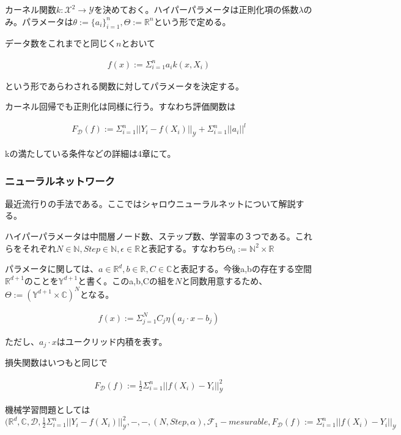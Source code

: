 \documentclass[dvipdfmx, a4paper]{jsarticle}
\begin{document}
カーネル関数$k:\mathcal{X}^2\to\mathcal{Y}$を決めておく。ハイパーパラメータは正則化項の係数$\lambda$のみ。パラメータは$\theta:=\{a_i\}^n_{i=1},\Theta:=\mathbb{R}^n$という形で定める。

データ数をこれまでと同じく$n$とおいて

\begin{align}
f(x):=\Sigma_{i=1}^na_ik(x,X_i)
\end{align}

という形であらわされる関数に対してパラメータを決定する。

カーネル回帰でも正則化は同様に行う。すなわち評価関数は

\begin{align}
F_\mathcal{D}(f):=\Sigma_{i=1}^n||Y_i-f(X_i)||_\mathcal{Y}+\Sigma_{i=1}^n||a_i||^l
\end{align}

kの満たしている条件などの詳細は4章にて。

\subsubsection{ニューラルネットワーク}
最近流行りの手法である。ここではシャロウニューラルネットについて解説する。

ハイパーパラメータは中間層ノード数、ステップ数、学習率の３つである。これらをそれぞれ$N\in\mathbb{N},Step\in\mathbb{N},\epsilon\in\mathbb{R}$と表記する。すなわち$\Theta_0:=\mathbb{N}^2\times\mathbb{R}$

パラメータに関しては、$a\in\mathbb{R}^d,b\in\mathbb{R},C\in\mathbb{C}$と表記する。今後a,bの存在する空間$\mathbb{R}^{d+1}$のことを$\mathbb{Y}^{d+1}$と書く。このa,b,Cの組を$N$と同数用意するため、$\Theta:=(\mathbb{Y}^{d+1}\times\mathbb{C})^N$となる。

\begin{align}
f(x):=\Sigma_{j=1}^NC_j\eta(a_j\cdot x-b_j)
\end{align}

ただし、$a_j\cdot x$はユークリッド内積を表す。

損失関数はいつもと同じで

\begin{align}
F_\mathcal{D}(f):=\frac{1}{2}\Sigma^n_{i=1}||f(X_i)-Y_i||^2_\mathcal{Y}
\end{align}

機械学習問題としては$(\mathbb{R}^d,\mathbb{C},\mathcal{D},\frac{1}{2}\Sigma^n_{i=1}||Y_i-f(X_i)||_\mathcal{Y}^2,-,-,(N,Step,\alpha),\mathcal{F}_1-mesurable,F_\mathcal{D}(f):=\Sigma^n_{i=1}||f(X_i)-Y_i||_\mathcal{Y}$
\end{document}
